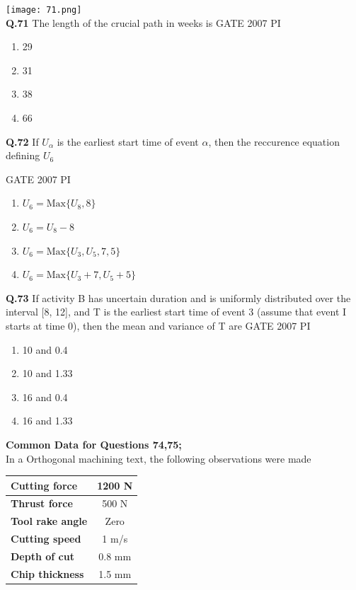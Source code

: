 \documentclass[journal,12pt,onecolumn]{exam}
\theoremstyle{remark}
\begin{document}
    \texttt{[image: 71.png]}\\
    
    \noindent
    \textbf{Q.71}
    The length of the crucial path in weeks is
    \hfill{GATE 2007 PI}
    \begin{enumerate}
        \item 29
        \item 31
        \item 38
        \item 66
    \end{enumerate}
    \noindent
    \textbf{Q.72}
    If $U_{\alpha}$ is the earliest start time of event $\alpha$, then the reccurence equation defining $U_{6}$
    
    \hfill{GATE 2007 PI}
    \begin{enumerate}
    \item $U_{6} = \mathrm{Max} \{ U_{8}, 8 \}$
    \item $U_{6} = U_{8} - 8$
    \item $U_{6} = \mathrm{Max} \{ U_{3}, U_{5}, 7, 5 \}$
    \item $U_{6} = \mathrm{Max} \{ U_{3} + 7, U_{5} + 5 \}$
\end{enumerate}
\noindent
\textbf{Q.73}
If activity B has uncertain duration and is uniformly distributed over the interval [8, 12], and T is the earliest start time of event 3 (assume that event I starts at time 0), then the mean and variance of T are
\hfill{GATE 2007 PI}
\begin{enumerate}
    \item 10 and 0.4
    \item 10 and 1.33
    \item 16 and 0.4
    \item 16 and 1.33
    
\end{enumerate}
\textbf{Common Data for Questions 74,75;}\\
In a Orthogonal machining text, the following observations were made\\
\begin{tabular}{|l|c|}
\hline
\textbf{Cutting force} & 1200 N \\ \hline
\textbf{Thrust force} & 500 N \\ \hline
\textbf{Tool rake angle} & Zero \\ \hline
\textbf{Cutting speed} & 1 m/s \\ \hline
\textbf{Depth of cut} & 0.8 mm \\ \hline
\textbf{Chip thickness} & 1.5 mm \\ \hline
\end{tabular}\\
\end{document}
